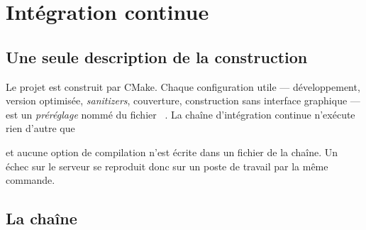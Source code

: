 \section{Intégration continue}
\label{sec-ci}

\subsection{Une seule description de la construction}

Le projet est construit par CMake. Chaque configuration utile --- développement, version
optimisée, \emph{sanitizers}, couverture, construction sans interface graphique --- est un
\emph{préréglage} nommé du fichier ~\cite{cmakepresets}. La chaîne d'intégration
continue n'exécute rien d'autre que

\begin{center}
   \quad{}\quad
\end{center}

et aucune option de compilation n'est écrite dans un fichier de la chaîne. Un échec sur le
serveur se reproduit donc sur un poste de travail par la même commande.

\subsection{La chaîne}

